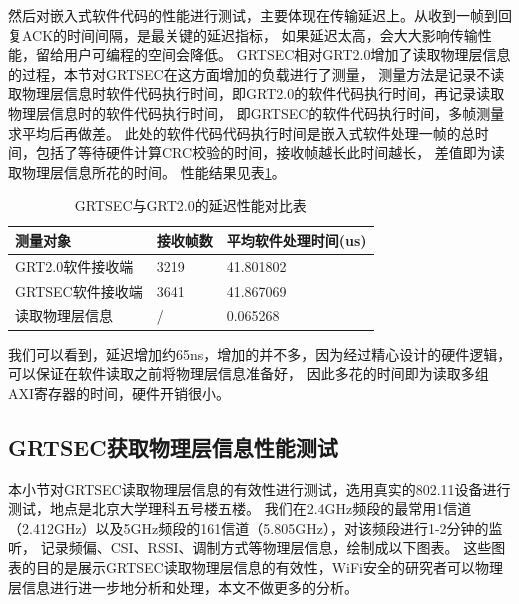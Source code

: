     然后对嵌入式软件代码的性能进行测试，主要体现在传输延迟上。从收到一帧到回复ACK的时间间隔，是最关键的延迟指标，
    如果延迟太高，会大大影响传输性能，留给用户可编程的空间会降低。
    GRTSEC相对GRT2.0增加了读取物理层信息的过程，本节对GRTSEC在这方面增加的负载进行了测量，
    测量方法是记录不读取物理层信息时软件代码执行时间，即GRT2.0的软件代码执行时间，再记录读取物理层信息时的软件代码执行时间，
    即GRTSEC的软件代码执行时间，多帧测量求平均后再做差。
    此处的软件代码代码执行时间是嵌入式软件处理一帧的总时间，包括了等待硬件计算CRC校验的时间，接收帧越长此时间越长，
    差值即为读取物理层信息所花的时间。
    性能结果见表\ref{tab:envaluate_grtsec_latency}。
    \begin{table}[!hbp]
    \centering
    \caption{GRTSEC与GRT2.0的延迟性能对比表}
    \label{tab:envaluate_grtsec_latency}
      \begin{tabular}{|l|l|l|} \hline
      测量对象 & 接收帧数 & 平均软件处理时间(us) \\ \hline
      GRT2.0软件接收端 & 3219 & 41.801802 \\ \hline
      GRTSEC软件接收端 & 3641 & 41.867069 \\ \hline
      读取物理层信息 & / & 0.065268 \\ \hline
      \end{tabular}
    \end{table}

    我们可以看到，延迟增加约65ns，增加的并不多，因为经过精心设计的硬件逻辑，可以保证在软件读取之前将物理层信息准备好，
    因此多花的时间即为读取多组AXI寄存器的时间，硬件开销很小。

    \subsection{GRTSEC获取物理层信息性能测试}\label{subsec:envaluation_phy_info}
    本小节对GRTSEC读取物理层信息的有效性进行测试，选用真实的802.11设备进行测试，地点是北京大学理科五号楼五楼。
    我们在2.4GHz频段的最常用1信道（2.412GHz）以及5GHz频段的161信道（5.805GHz），对该频段进行1-2分钟的监听，
    记录频偏、CSI、RSSI、调制方式等物理层信息，绘制成以下图表。
    这些图表的目的是展示GRTSEC读取物理层信息的有效性，WiFi安全的研究者可以物理层信息进行进一步地分析和处理，本文不做更多的分析。

